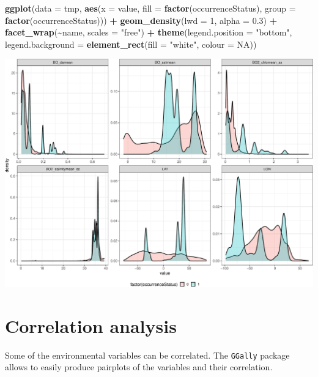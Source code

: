 \documentclass[
]{book}
\newenvironment{Shaded}{\begin{snugshade}}{\end{snugshade}}
\newcommand{\AttributeTok}[1]{\textcolor[rgb]{0.13,0.29,0.53}{#1}}
\newcommand{\ConstantTok}[1]{\textcolor[rgb]{0.56,0.35,0.01}{#1}}
\newcommand{\DecValTok}[1]{\textcolor[rgb]{0.00,0.00,0.81}{#1}}
\newcommand{\FloatTok}[1]{\textcolor[rgb]{0.00,0.00,0.81}{#1}}
\newcommand{\FunctionTok}[1]{\textcolor[rgb]{0.13,0.29,0.53}{\textbf{#1}}}
\newcommand{\NormalTok}[1]{#1}
\newcommand{\SpecialCharTok}[1]{\textcolor[rgb]{0.81,0.36,0.00}{\textbf{#1}}}
\newcommand{\StringTok}[1]{\textcolor[rgb]{0.31,0.60,0.02}{#1}}
\begin{document}
\begin{Shaded}
\begin{Highlighting}[]
\FunctionTok{ggplot}\NormalTok{(}\AttributeTok{data =}\NormalTok{ tmp, }\FunctionTok{aes}\NormalTok{(}\AttributeTok{x =}\NormalTok{ value, }\AttributeTok{fill =} \FunctionTok{factor}\NormalTok{(occurrenceStatus),}
    \AttributeTok{group =} \FunctionTok{factor}\NormalTok{(occurrenceStatus))) }\SpecialCharTok{+}
    \FunctionTok{geom\_density}\NormalTok{(}\AttributeTok{lwd =} \DecValTok{1}\NormalTok{, }\AttributeTok{alpha =} \FloatTok{0.3}\NormalTok{) }\SpecialCharTok{+}
    \FunctionTok{facet\_wrap}\NormalTok{(}\SpecialCharTok{\textasciitilde{}}\NormalTok{name, }\AttributeTok{scales =} \StringTok{"free"}\NormalTok{) }\SpecialCharTok{+}
    \FunctionTok{theme}\NormalTok{(}\AttributeTok{legend.position =} \StringTok{"bottom"}\NormalTok{, }\AttributeTok{legend.background =} \FunctionTok{element\_rect}\NormalTok{(}\AttributeTok{fill =} \StringTok{"white"}\NormalTok{,}
        \AttributeTok{colour =} \ConstantTok{NA}\NormalTok{))}
\end{Highlighting}
\end{Shaded}

\includegraphics{_main_files/figure-latex/unnamed-chunk-50-2.pdf}

\section{Correlation analysis}\label{correlation-analysis}

Some of the environmental variables can be correlated. The \texttt{GGally} package allows to easily produce pairplots of the variables and their correlation.
\end{document}
